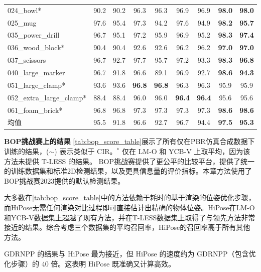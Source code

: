 \begin{table}[ht]
{\begin{tabular}{@{}l|c|c|c|c|c|c|c|c@{}}
       024\_bowl*             & 90.2 &  90.2& 96.3& 96.3& 96.9& 96.9           &\textbf{98.0}	&\textbf{98.0}\\
       025\_mug               & 97.6&  95.4& 97.3& 94.2& 97.6& 94.9         & \textbf{98.2}	&\textbf{95.7}\\
       035\_power\_drill      & 96.7&  95.1& 97.2& 95.9& 96.9& 95.2           & \textbf{98.3}&	\textbf{97.4}\\
       036\_wood\_block*      & 90.4&  90.4& 92.6& 92.6& 96.2& 96.2           & \textbf{97.0}	&\textbf{97.0}\\
       037\_scissors          & 96.7&  92.7& 97.7& 95.7& 97.2& 93.3            &\textbf{98.3}&	\textbf{96.8}\\
       040\_large\_marker     & 96.7&  91.8& 96.6& 89.1& 96.9 &92.7          & \textbf{98.6}	&\textbf{94.3}\\
       051\_large\_clamp*     & 93.6&  93.6&  \textbf{96.8}& \textbf{96.8}& 96.3 &96.3          & 95.9&	95.9\\
       052\_extra\_large\_clamp* & 88.4&  88.4& 96.0& 96.0 &\textbf{96.4}& \textbf{96.4}         & 95.6&	95.6\\
       061\_foam\_brick*          & 96.8&  96.8& 97.3& 97.3& 97.3 &97.3       & \textbf{98.6}	&\textbf{98.6}\\
       \hline
       均值 & 95.5&  91.8&  96.6 &92.7& 96.7 &94.4             &\textbf{97.5} &\textbf{95.3} \\
      \bottomrule
    \end{tabular}
    }
\end{table}

\textbf{BOP挑战赛上的结果 } \autoref{tab:bop_score_table}展示了所有仅在PBR仿真合成数据下训练的结果，($\sim$) 表示类似于 CIR\cite{lipson2022coupled}。$^*$ 仅在 LM-O 和 YCB-V 上取平均，因为该方法未提供 T-LESS 的结果。 BOP挑战赛提供了更公平的比较平台，提供了统一的训练数据集和标准2D检测结果，以及更具信息量的评价指标\cite{hodan2018bop}。本章方法使用了BOP挑战赛2023提供的默认检测结果。

大多数在\autoref{tab:bop_score_table}中的方法依赖于耗时的基于渲染的位姿优化步骤，而HiPose无需任何渲染对比过程即可直接估计出精确的物体位姿。HiPose在LM-O和YCB-V数据集上超越了现有方法，并在T-LESS数据集上取得了与领先方法非常接近的结果。综合考虑三个数据集的平均召回率，HiPose的召回率高于所有其他方法。

GDRNPP\cite{wang2021gdr} 的结果与 HiPose 最为接近，但 HiPose 的速度约为 GDRNPP（包含优化步骤）的 $40$ 倍。这表明 HiPose 既准确又计算高效。

